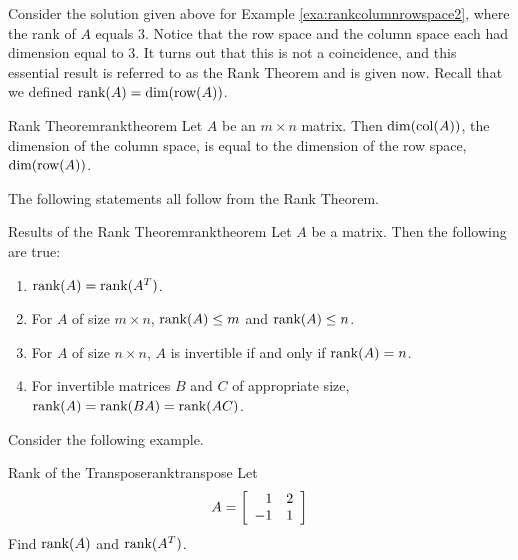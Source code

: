Consider the solution given above for Example
\ref{exa:rankcolumnrowspace2}, where the rank of $A$ equals
$3$. Notice that the row space and the column space each had dimension
equal to $3$. It turns out that this is not a coincidence, and this
essential result is referred to as the Rank Theorem and is given
now. Recall that we defined $\mbox{rank}(A) = \mbox{dim}(\mbox{row}(A))$. 

\begin{theorem}{Rank Theorem}{ranktheorem}
Let $A$ be an $m \times n$ matrix. Then $\mbox{dim}(\mbox{col} (A))$, the dimension of the column space, is equal to the dimension of the row space, $\mbox{dim}(\mbox{row}(A))$.
\end{theorem}

The following statements all follow from the Rank Theorem.

\begin{corollary}{Results of the Rank Theorem}{ranktheorem}
Let $A$ be a matrix. Then the following are true:
\begin{enumerate}
\item
 $\mbox{rank}(A) = \mbox{rank}(A^T)$.
\item
For $A$ of size $m \times n$, $\mbox{rank}(A) \leq m$ and $\mbox{rank}(A) \leq n$.
\item
For $A$ of size $n \times n$,  $A$ is invertible if and only if $\mbox{rank}(A) = n$.
\item
For invertible matrices $B$ and $C$ of appropriate size, 
$\mbox{rank}(A) = \mbox{rank}(BA) = \mbox{rank}(AC)$. 
\end{enumerate}
\end{corollary}

Consider the following example.

\begin{example}{Rank of the Transpose}{ranktranspose}
Let \[
A = 
\left[
\begin{array}{rr}
1 & 2 \\
-1 & 1 
\end{array} \right]
\]
Find $\mbox{rank}(A)$ and $\mbox{rank}(A^T)$.
\end{example}

